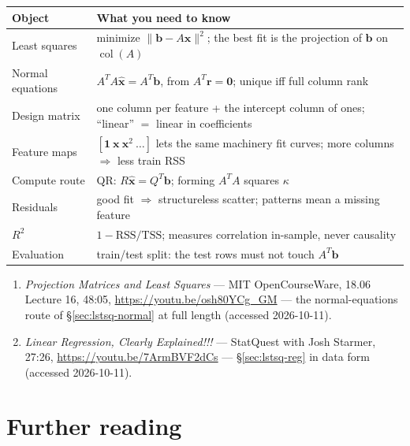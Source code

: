 \begin{center}
\begin{tabularx}{\textwidth}{l>{\raggedright\arraybackslash}X}
\toprule
\textbf{Object} & \textbf{What you need to know}\\
\midrule
Least squares & minimize $\lVert\mathbf b-A\mathbf x\rVert^2$; the best
fit is the projection of $\mathbf b$ on $\operatorname{col}(A)$ \\
Normal equations & $A^{T}A\hat{\mathbf x}=A^{T}\mathbf b$, from
$A^{T}\mathbf r=\mathbf0$; unique iff full column rank \\
Design matrix & one column per feature + the intercept column of ones;
``linear'' $=$ linear in coefficients \\
Feature maps & $[\mathbf1\ \mathbf x\ \mathbf x^2\ \dots]$ lets the same
machinery fit curves; more columns $\Rightarrow$ less train RSS \\
Compute route & QR: $R\hat{\mathbf x}=Q^{T}\mathbf b$; forming $A^{T}A$
squares $\kappa$ \\
Residuals & good fit $\Rightarrow$ structureless scatter; patterns mean a
missing feature \\
$R^{2}$ & $1-\mathrm{RSS}/\mathrm{TSS}$; measures correlation in-sample,
never causality \\
Evaluation & train/test split: the test rows must not touch
$A^{T}\mathbf b$ \\
\bottomrule
\end{tabularx}
\end{center}
\begin{rulebox}
\begin{enumerate}
\item \emph{Projection Matrices and Least Squares} --- MIT
OpenCourseWare, 18.06 Lecture 16, 48:05,
\url{https://youtu.be/osh80YCg_GM} --- the normal-equations route of
\S\ref{sec:lstsq-normal} at full length (accessed 2026-10-11).
\item \emph{Linear Regression, Clearly Explained!!!} --- StatQuest
with Josh Starmer, 27:26, \url{https://youtu.be/7ArmBVF2dCs} ---
\S\ref{sec:lstsq-reg} in data form (accessed 2026-10-11).
\end{enumerate}
\end{rulebox}

\section*{Further reading}

